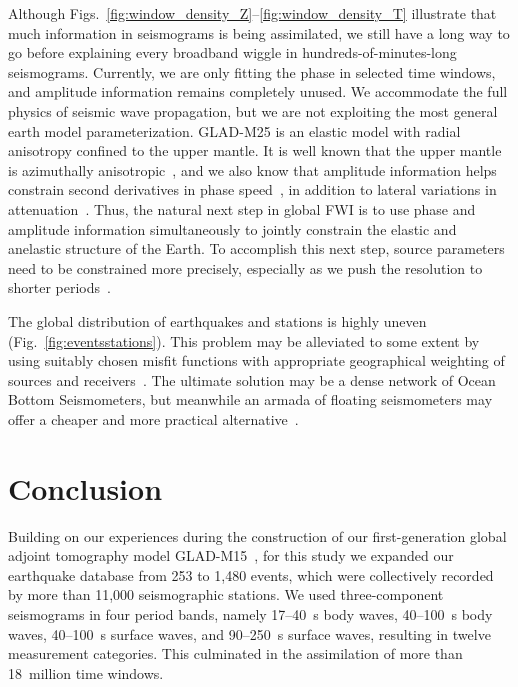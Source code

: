 \documentclass[extra,mreferee]{gji}
\begin{document}
Although Figs.~\ref{fig:window_density_Z}--\ref{fig:window_density_T} illustrate that much information in seismograms is
being assimilated, we still have a long way to go before explaining every broadband wiggle in hundreds-of-minutes-long seismograms.
Currently, we are only fitting the phase in selected time windows, and amplitude information remains completely unused.
We accommodate the full physics of seismic wave propagation,
but we are not exploiting the most general earth model parameterization.
GLAD-M25 is an elastic model with radial anisotropy confined to the upper mantle.
It is well known that the upper mantle is azimuthally anisotropic~\citep[e.g.,][]{montagner1989petrological,montagner1991},
and we also know that amplitude information helps constrain second derivatives in phase speed~\citep[e.g.,][]{WW86,TDI,TDII},
in addition to lateral variations in attenuation~\cite[e.g.,][]{romanowicz1998,reidetal2001,DaEkDz08}.
Thus, the natural next step in global FWI is to use phase and amplitude information simultaneously to jointly constrain the elastic and anelastic structure of the Earth.
To accomplish this next step, source parameters need to be constrained more precisely, especially as we push the resolution to shorter periods~\citep[e.g.,][]{valentine2010}.

The global distribution of earthquakes and stations is highly uneven (Fig.~\ref{fig:eventsstations}).
This problem may be alleviated to some extent by using suitably chosen misfit functions with appropriate geographical weighting of sources and receivers~\citep[e.g.,][]{Li1996,Ruanetal2018}.
The ultimate solution may be a dense network of Ocean Bottom Seismometers,
but meanwhile an armada of floating seismometers may offer a cheaper and more practical alternative~\citep[e.g.,][]{Nolet19}.

\section{Conclusion}

Building on our experiences during the construction of our first-generation global adjoint tomography model GLAD-M15~\citep{bozdaug2016global},
for this study we expanded our earthquake database from 253 to 1,480 events,
which were collectively recorded by more than 11,000 seismographic stations.
We used three-component seismograms in four period bands,
namely 17--40~s body waves, 40--100~s body waves, 40--100~s surface waves, and 90--250~s surface waves,
resulting in twelve measurement categories.
This culminated in the assimilation of more than 18~million time windows.
\end{document}
